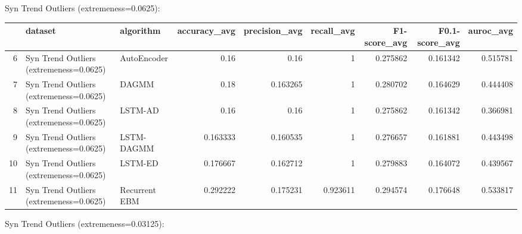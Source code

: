 Syn Trend Outliers (extremeness=0.0625):

\begin{tabular}{rllrrrrrr}
\hline
    & dataset                                 & algorithm     &   accuracy\_avg &   precision\_avg &   recall\_avg &   F1-score\_avg &   F0.1-score\_avg &   auroc\_avg \\
\hline
  6 & Syn Trend Outliers (extremeness=0.0625) & AutoEncoder   &       0.16     &        0.16     &     1        &       0.275862 &         0.161342 &    0.515781 \\
  7 & Syn Trend Outliers (extremeness=0.0625) & DAGMM         &       0.18     &        0.163265 &     1        &       0.280702 &         0.164629 &    0.444408 \\
  8 & Syn Trend Outliers (extremeness=0.0625) & LSTM-AD       &       0.16     &        0.16     &     1        &       0.275862 &         0.161342 &    0.366981 \\
  9 & Syn Trend Outliers (extremeness=0.0625) & LSTM-DAGMM    &       0.163333 &        0.160535 &     1        &       0.276657 &         0.161881 &    0.443498 \\
 10 & Syn Trend Outliers (extremeness=0.0625) & LSTM-ED       &       0.176667 &        0.162712 &     1        &       0.279883 &         0.164072 &    0.439567 \\
 11 & Syn Trend Outliers (extremeness=0.0625) & Recurrent EBM &       0.292222 &        0.175231 &     0.923611 &       0.294574 &         0.176648 &    0.533817 \\
\hline
\end{tabular}

Syn Trend Outliers (extremeness=0.03125):


